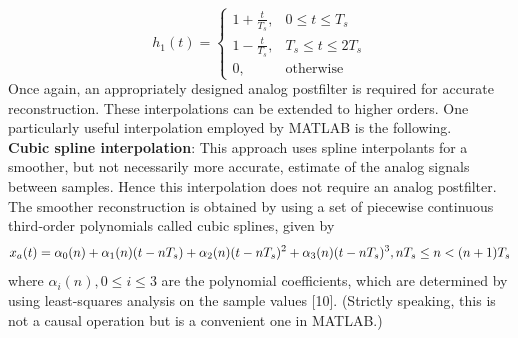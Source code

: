 \documentclass{article}
\begin{document}
\vspace{1em}
\begin{equation}
h_1(t) = \begin{cases}
1 + \frac{t}{T_s}, & 0 \leq t \leq T_s \\
1 - \frac{t}{T_s}, & T_s \leq t \leq 2T_s \\
0, & \text{otherwise}
\end{cases}
\end{equation}
Once again, an appropriately designed analog postfilter is required for
accurate reconstruction. These interpolations can be extended to higher orders. One particularly useful interpolation employed by MATLAB is
the following. \\
\vspace{1em}
\textbf{Cubic spline interpolation}: This approach uses spline interpolants
for a smoother, but not necessarily more accurate, estimate of the analog signals between samples. Hence this interpolation does not require
an analog postfilter. The smoother reconstruction is obtained by using a set of piecewise continuous third-order polynomials called cubic
splines, given by \\
\begin{equation}
x_a(t) = \alpha_0(n)+ \alpha_1(n)(t-nT_s)+\alpha_2(n)(t-nT_s)^2+\alpha_3(n)(t-nT_s)^3, \space \space nT_s \leq n < (n+1)T_s
\end{equation}
where ${\alpha_i(n), 0 \leq i \leq 3}$ are the polynomial coefficients, which are determined by using least-squares analysis on the sample values [10].
(Strictly speaking, this is not a causal operation but is a convenient
one in MATLAB.)
\end{document}
